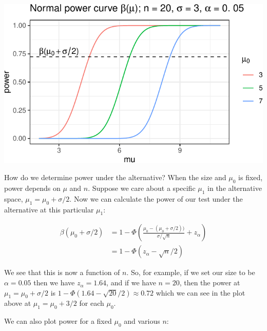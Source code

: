 \documentclass[11pt,]{article}
\begin{document}
\begin{center}\includegraphics[width=1\linewidth]{class_notes_files/figure-latex/plot_normal_power_curve-1} \end{center}

How do we determine power under the alternative? When the size and
\(\mu_0\) is fixed, power depends on \(\mu\) and \(n\). Suppose we care
about a specific \(\mu_1\) in the alternative space,
\(\mu_1 = \mu_0 + \sigma/2\). Now we can calculate the power of our test
under the alternative at this particular \(\mu_1\):

\begin{align*}
\beta(\mu_0 + \sigma/2) &= 1 - \Phi\left(\frac{\mu_0 - (\mu_0 + \sigma/2)) }{\sigma/\sqrt{n}} + z_\alpha\right)\\
&= 1- \Phi\left(z_\alpha - \sqrt{n}/2\right)
\end{align*}

We see that this is now a function of \(n\). So, for example, if we set
our size to be \(\alpha = 0.05\) then we have \(z_\alpha = 1.64\), and
if we have \(n=20\), then the power at \(\mu_1 = \mu_0 + \sigma/2\) is
\(1-\Phi(1.64-\sqrt{20}/2) \approx 0.72\) which we can see in the plot
above at \(\mu_1 = \mu_0+3/2\) for each \(\mu_0\).

We can also plot power for a fixed \(\mu_0\) and various \(n\):
\end{document}
